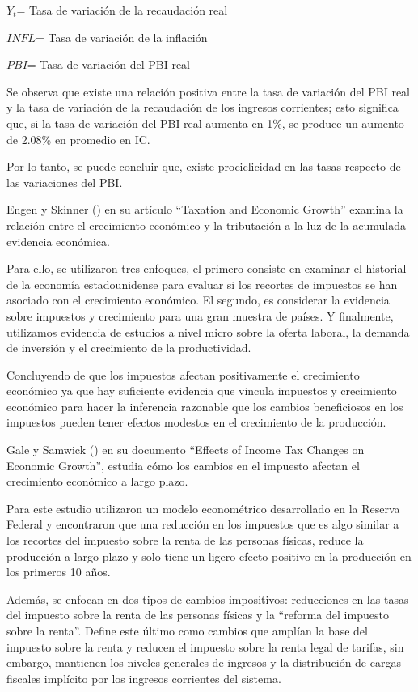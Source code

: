 \documentclass[
  jou,
  floatsintext,
  longtable,
  a4paper,
  nolmodern,
  notxfonts,
  notimes,
  12pt,
  colorlinks=true,linkcolor=blue,citecolor=blue,urlcolor=blue]{apa7}
\begin{document}
\(Y_t\)= Tasa de variación de la recaudación real

\(INFL\)= Tasa de variación de la inflación

\(PBI\)= Tasa de variación del PBI real

Se observa que existe una relación positiva entre la tasa de variación
del PBI real y la tasa de variación de la recaudación de los ingresos
corrientes; esto significa que, si la tasa de variación del PBI real
aumenta en 1\%, se produce un aumento de 2.08\% en promedio en IC.

Por lo tanto, se puede concluir que, existe prociclicidad en las tasas
respecto de las variaciones del PBI.

Engen y Skinner () en su
artículo ``Taxation and Economic Growth'' examina la relación entre el
crecimiento económico y la tributación a la luz de la acumulada
evidencia económica.

Para ello, se utilizaron tres enfoques, el primero consiste en examinar
el historial de la economía estadounidense para evaluar si los recortes
de impuestos se han asociado con el crecimiento económico. El segundo,
es considerar la evidencia sobre impuestos y crecimiento para una gran
muestra de países. Y finalmente, utilizamos evidencia de estudios a
nivel micro sobre la oferta laboral, la demanda de inversión y el
crecimiento de la productividad.

Concluyendo de que los impuestos afectan positivamente el crecimiento
económico ya que hay suficiente evidencia que vincula impuestos y
crecimiento económico para hacer la inferencia razonable que los cambios
beneficiosos en los impuestos pueden tener efectos modestos en el
crecimiento de la producción.

Gale y Samwick () en su documento
``Effects of Income Tax Changes on Economic Growth'', estudia cómo los
cambios en el impuesto afectan el crecimiento económico a largo plazo.

Para este estudio utilizaron un modelo econométrico desarrollado en la
Reserva Federal y encontraron que una reducción en los impuestos que es
algo similar a los recortes del impuesto sobre la renta de las personas
físicas, reduce la producción a largo plazo y solo tiene un ligero
efecto positivo en la producción en los primeros 10 años.

Además, se enfocan en dos tipos de cambios impositivos: reducciones en
las tasas del impuesto sobre la renta de las personas físicas y la
``reforma del impuesto sobre la renta''. Define este último como cambios
que amplían la base del impuesto sobre la renta y reducen el impuesto
sobre la renta legal de tarifas, sin embargo, mantienen los niveles
generales de ingresos y la distribución de cargas fiscales implícito por
los ingresos corrientes del sistema.
\end{document}
